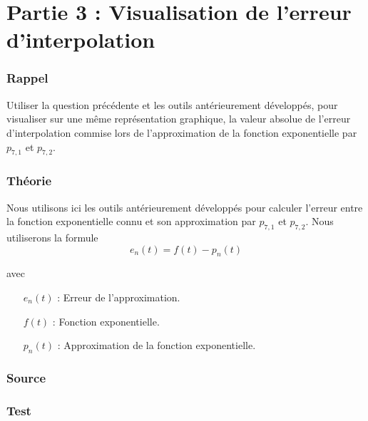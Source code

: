 \documentclass[a4paper,10pt]{report}
\begin{document}
\chapter*{Partie 3 : Visualisation de l’erreur d’interpolation}

\subsection*{Rappel}
Utiliser la question précédente et les outils antérieurement développés, pour
visualiser sur une même représentation graphique, la valeur absolue de l’erreur
d’interpolation commise lors de l’approximation de la fonction exponentielle
par $p_{7,1}$ et $p_{7,2}$.


\subsection*{Théorie}
Nous utilisons ici les outils antérieurement développés pour calculer l'erreur entre la fonction exponentielle connu et son approximation par $p_{7,1}$ et $p_{7,2}$.
Nous utiliserons la formule
\begin{equation}
	e_{n}(t) = f(t) - p_{n}(t)
\end{equation}

avec

\begin{list}{}{}
\item
\begin{itemize}
	\item[$e_{n}(t)$]: Erreur de l'approximation.
	\item[$f(t)$]: Fonction exponentielle.
	\item[$p_{n}(t)$]: Approximation de la fonction exponentielle.
\end{itemize}
\end{list}

\subsection*{Source}
\begin{center}
	
\end{center}

\subsection*{Test}
\end{document}
